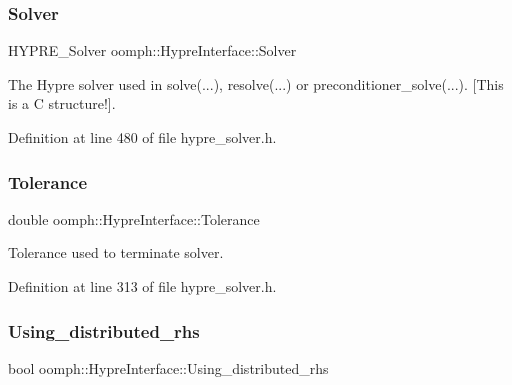 \subsubsection{\texorpdfstring{Solver}{Solver}}
{\footnotesize\ttfamily H\+Y\+P\+R\+E\+\_\+\+Solver oomph\+::\+Hypre\+Interface\+::\+Solver\hspace{0.3cm}{\ttfamily [private]}}



The Hypre solver used in solve(...), resolve(...) or preconditioner\+\_\+solve(...). \mbox{[}This is a C structure!\mbox{]}. 



Definition at line 480 of file hypre\+\_\+solver.\+h.

\mbox{\label{classoomph_1_1HypreInterface_aa32a993d324c6b198726064299a4e924}} 
\subsubsection{\texorpdfstring{Tolerance}{Tolerance}}
{\footnotesize\ttfamily double oomph\+::\+Hypre\+Interface\+::\+Tolerance\hspace{0.3cm}{\ttfamily [protected]}}



Tolerance used to terminate solver. 



Definition at line 313 of file hypre\+\_\+solver.\+h.

\mbox{\label{classoomph_1_1HypreInterface_a3e1fd87d247b737001fb366bf4a7081f}} 
\subsubsection{\texorpdfstring{Using\+\_\+distributed\+\_\+rhs}{Using\_distributed\_rhs}}
{\footnotesize\ttfamily bool oomph\+::\+Hypre\+Interface\+::\+Using\+\_\+distributed\+\_\+rhs\hspace{0.3cm}{\ttfamily [protected]}}



